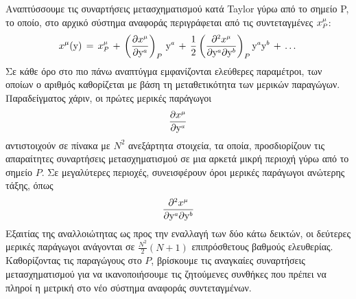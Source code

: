 Αναπτύσσουμε τις συναρτήσεις μετασχηματισμού κατά Taylor γύρω από το σημείο P, το οποίο, στο αρχικό σύστημα αναφοράς περιγράφεται από τις συντεταγμένες $x\superscr{\mu}\subscr{P}$:
\begin{equation}
    x\indices{^\mu}(\y) \,=\, x\superscr{\mu}\subscr{P} \,+\, \left( \frac{\partial x\superscr{\mu}}{\partial \y\superscr{a}} \right)_P\,\y\superscr{a} \,+\, \frac{1}{2}\left( \frac{\partial\superscr{2} x\superscr{\mu}}{\partial \y\superscr{a} \partial \y\superscr{b}} \right)_{P} \y\superscr{a} \y\superscr{b} \,+\, \dots
\end{equation}
Σε κάθε όρο στο πιο πάνω αναπτύγμα εμφανίζονται ελεύθερες παραμέτροι, των οποίων ο αριθμός καθορίζεται με βάση τη μεταθετικότητα των μερικών παραγώγων. Παραδείγματος χάριν, οι πρώτες μερικές παράγωγοι 
\begin{equation}\label{secterm}
    \frac{\partial x\superscr{\mu}}{\partial \y\superscr{a}}
\end{equation}
αντιστοιχούν σε πίνακα με $N^2$ ανεξάρτητα στοιχεία, τα οποία, προσδιορίζουν τις απαραίτητες συναρτήσεις μετασχηματισμού σε μια αρκετά μικρή περιοχή γύρω από το σημείο $P$. Σε μεγαλύτερες περιοχές, συνεισφέρουν όροι μερικές παράγωγοι ανώτερης τάξης, όπως 
\begin{equation}\label{thrterm}
    \frac{\partial\superscr{2} x\superscr{\mu}}{\partial \y\superscr{a} \partial \y\superscr{b}}
\end{equation}
Εξαιτίας της αναλλοιώτητας ως προς την εναλλαγή των δύο κάτω δεικτών, οι δεύτερες μερικές παράγωγοι ανάγονται σε $\frac{N^2}{2}(N+1)$ επιπρόσθετους βαθμούς ελευθερίας. Καθορίζοντας τις παραγώγους στο $P$, βρίσκουμε τις αναγκαίες συναρτήσεις μετασχηματισμού για να ικανοποιήσουμε τις ζητούμενες συνθήκες που πρέπει να πληροί η μετρική στο νέο σύστημα αναφοράς συντεταγμένων.\\

